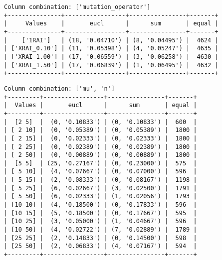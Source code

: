 \documentclass{article}
\begin{document}
\begin{verbatim}
Column combination: ['mutation_operator']
+---------------+-----------------+----------------+-------+
|     Values    |       eucl      |      sum       | equal |
+---------------+-----------------+----------------+-------+
|    ['1RAI']   | (18, '0.04710') | (8, '0.04495') |  4624 |
| ['XRAI_0.10'] | (11, '0.05398') | (4, '0.05247') |  4635 |
| ['XRAI_1.00'] | (17, '0.06559') | (3, '0.06258') |  4630 |
| ['XRAI_1.50'] | (17, '0.06839') | (1, '0.06495') |  4632 |
+---------------+-----------------+----------------+-------+
\end{verbatim}

\begin{verbatim}
Column combination: ['mu', 'n']
+---------+-----------------+----------------+-------+
|  Values |       eucl      |      sum       | equal |
+---------+-----------------+----------------+-------+
|  [2 5]  |  (0, '0.10833') | (0, '0.10833') |  600  |
| [ 2 10] |  (0, '0.05389') | (0, '0.05389') |  1800 |
| [ 2 15] |  (0, '0.02333') | (0, '0.02333') |  1800 |
| [ 2 25] |  (0, '0.02389') | (0, '0.02389') |  1800 |
| [ 2 50] |  (0, '0.00889') | (0, '0.00889') |  1800 |
|  [5 5]  | (25, '0.27167') | (0, '0.23000') |  575  |
| [ 5 10] |  (4, '0.07667') | (0, '0.07000') |  596  |
| [ 5 15] |  (2, '0.08333') | (0, '0.08167') |  1198 |
| [ 5 25] |  (6, '0.02667') | (3, '0.02500') |  1791 |
| [ 5 50] |  (6, '0.02333') | (1, '0.02056') |  1793 |
| [10 10] |  (4, '0.18500') | (0, '0.17833') |  596  |
| [10 15] |  (5, '0.18500') | (0, '0.17667') |  595  |
| [10 25] |  (3, '0.05000') | (1, '0.04667') |  596  |
| [10 50] |  (4, '0.02722') | (7, '0.02889') |  1789 |
| [25 25] |  (2, '0.14833') | (0, '0.14500') |  598  |
| [25 50] |  (2, '0.06833') | (4, '0.07167') |  594  |
+---------+-----------------+----------------+-------+
\end{verbatim}
\end{document}
